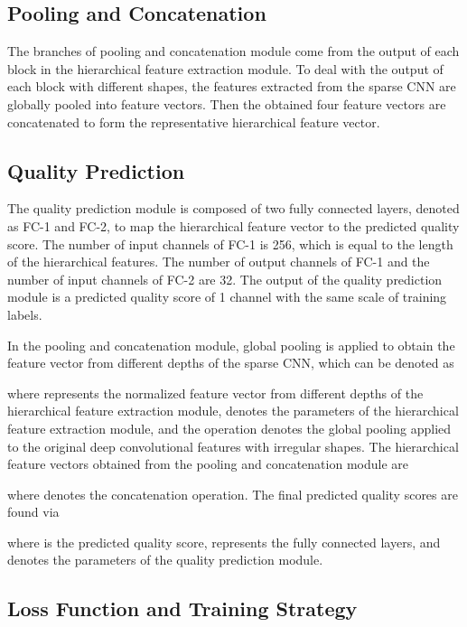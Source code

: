 \documentclass[acmsmall]{acmart}
\begin{document}
\subsection{Pooling and Concatenation}

\par The branches of pooling and concatenation module come from the output of each block in the hierarchical feature extraction module. To deal with the output of each block with different shapes, the features extracted from the sparse CNN are globally pooled into  feature vectors. Then the obtained four  feature vectors are concatenated to form the  representative hierarchical feature vector.


\subsection{Quality Prediction}

\par The quality prediction module is composed of two fully connected layers, denoted as FC-1 and FC-2, to map the hierarchical feature vector to the predicted quality score. The number of input channels of FC-1 is 256, which is equal to the length of the hierarchical features. The number of output channels of FC-1 and the number of input channels of FC-2 are 32. The output of the quality prediction module is a predicted quality score of 1 channel with the same scale of training labels.
\par In the pooling and concatenation module, global pooling is applied to obtain the feature vector from different depths of the sparse CNN, which can be denoted as

where  represents the normalized feature vector from different depths of the hierarchical feature extraction module,  denotes the parameters of the hierarchical feature extraction module, and the operation  denotes the global pooling applied to the original deep convolutional features with irregular shapes. The hierarchical feature vectors obtained from the pooling and concatenation module are

where  denotes the concatenation operation. The final predicted quality scores are found via

where  is the predicted quality score,  represents the fully connected layers, and  denotes the parameters of the quality prediction module.

\subsection{Loss Function and Training Strategy}
\end{document}
